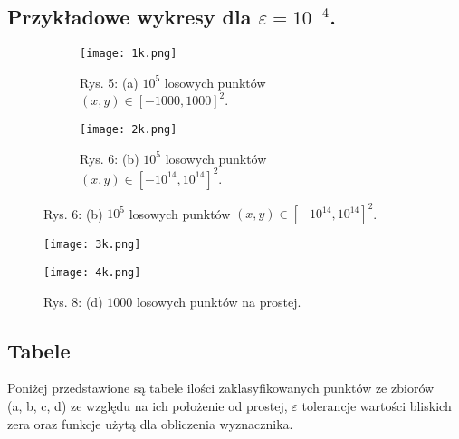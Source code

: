 
\subsection{Przykładowe wykresy dla $\varepsilon = 10^{-4}$.}
\null
\begin{figure}[!ht]
    \centering
    \begin{subfigure}{.5\textwidth}
      \centering
      \texttt{[image: 1k.png]}
      \caption*{Rys. 5: (a) $10^5$ losowych punktów \\$(x, y) \in \left[-1000,1000\right]^{2}$.}
      \label{fig:sub1}
    \end{subfigure}%
    \begin{subfigure}{.5\textwidth}
      \centering
      \texttt{[image: 2k.png]}
      \caption*{Rys. 6: (b) $10^5$ losowych punktów $(x, y) \in \left[-10^{14},10^{14}\right]^{2}$.}
      \label{fig:sub2}
    \end{subfigure}
    \label{fig:test}
    \end{figure}
    
    \begin{figure}[!ht]
    \centering
    \begin{minipage}{.5\textwidth}
      \centering
      \texttt{[image: 3k.png]}
      \caption*{Rys. 7: (c) $1000$ losowych punktów leżących na okręgu.}
      \label{fig:test1}
    \end{minipage}%
    \begin{minipage}{.5\textwidth}
      \centering
      \texttt{[image: 4k.png]}
      \caption*{Rys. 8: (d) $ 1000$ losowych punktów na prostej.}
      \label{fig:test2}
    \end{minipage}
    \end{figure}
    \newpage
\subsection{Tabele}
\quad Poniżej przedstawione są tabele ilości zaklasyfikowanych punktów
 ze zbiorów \\ (a, b, c, d) ze względu na ich położenie od prostej, $\varepsilon$ tolerancje
 wartości bliskich zera oraz funkcje użytą dla obliczenia wyznacznika.\\ \\

